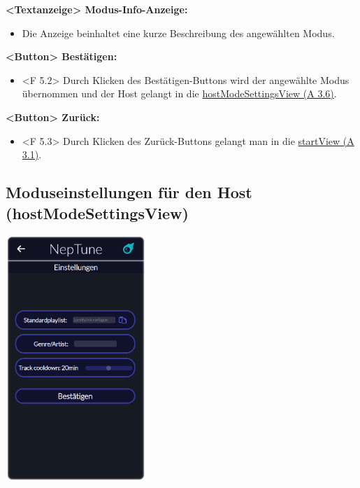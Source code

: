 \documentclass[oneside, ngerman]{sdqtechreport}
\begin{document}
\textbf{<Textanzeige> Modus-Info-Anzeige:}
\begin{itemize}
    \item Die Anzeige beinhaltet eine kurze Beschreibung des angewählten Modus.
\end{itemize}

\textbf{<Button> Bestätigen:}
\begin{itemize}
    \item <F 5.2> Durch Klicken des Bestätigen-Buttons wird der angewählte Modus übernommen und der Host gelangt in die \hyperlink{hostModeSettingsView}{hostModeSettingsView (A 3.6)}.
\end{itemize}

\textbf{<Button> Zurück:}
\begin{itemize}
    \item <F 5.3> Durch Klicken des Zurück-Buttons gelangt man in die  \hyperlink{startView}{startView (A 3.1)}.
\end{itemize}



\subsection{Moduseinstellungen für den Host (hostModeSettingsView)}
\label{sec:Benutzeroberfläche:hostModeSettingsView}

\begin{center}
    \hypertarget{hostModeSettingsView}{}
    \includegraphics[width=0.4\textwidth]{LATEX/Pflichtenheft/GraphicDesigns/hostModusSettingsPage.png}
\end{center}
\end{document}
